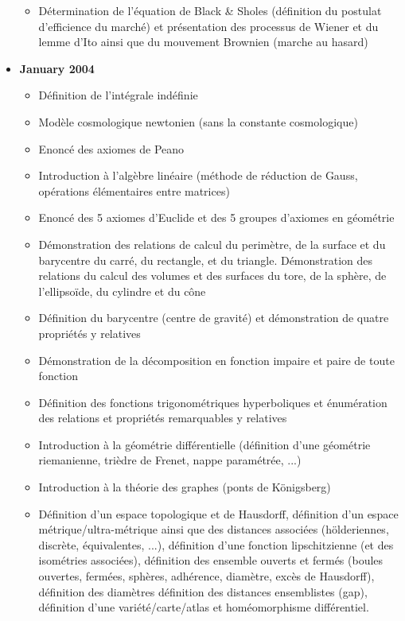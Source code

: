 \documentclass[12pt,a4paper,twoside,openright]{report}
\theoremstyle{definition}
\theoremstyle{itexmp}
\numberwithin{equation}{section}
\begin{document}
\begin{itemize}
\begin{itemize}[noitemsep]
				\item Détermination de l'équation de Black \& Sholes (définition du postulat d'efficience du marché) et présentation des processus de Wiener et du lemme d'Ito ainsi que du mouvement Brownien (marche au hasard)
			\end{itemize}
		\item \textbf{January 2004}
			\begin{itemize}[noitemsep]
				\item Définition de l'intégrale indéfinie
				\item Modèle cosmologique newtonien (sans la constante cosmologique)
				\item Enoncé des axiomes de Peano
				\item Introduction à l'algèbre linéaire (méthode de réduction de Gauss, opérations élémentaires entre matrices)
				\item Enoncé des 5 axiomes d'Euclide et des 5 groupes d'axiomes en géométrie
				\item Démonstration des relations de calcul du perimètre, de la surface et du barycentre du carré, du rectangle, et du triangle. Démonstration des relations du calcul des volumes et des surfaces du tore, de la sphère, de l'ellipsoïde, du cylindre et du cône
				\item Définition du barycentre (centre de gravité) et démonstration de quatre propriétés y relatives
				\item Démonstration de la décomposition en fonction impaire et paire de toute fonction 
				\item Définition des fonctions trigonométriques hyperboliques et énumération des relations et propriétés remarquables y relatives
				\item Introduction à la géométrie différentielle (définition d'une géométrie riemanienne, trièdre de Frenet, nappe paramétrée, ...)
				\item Introduction à la théorie des graphes (ponts de Königsberg)
				\item Définition d'un espace topologique et de Hausdorff, définition d'un espace métrique/ultra-métrique ainsi que des distances associées (hölderiennes, discrète, équivalentes, ...), définition d'une fonction lipschitzienne (et des isométries associées), définition des ensemble ouverts et fermés (boules ouvertes, fermées, sphères, adhérence, diamètre, excès de Hausdorff), définition des diamètres définition des distances ensemblistes (gap), définition d'une variété/carte/atlas et homéomorphisme différentiel.

\end{itemize}
\end{itemize}
\end{document}
